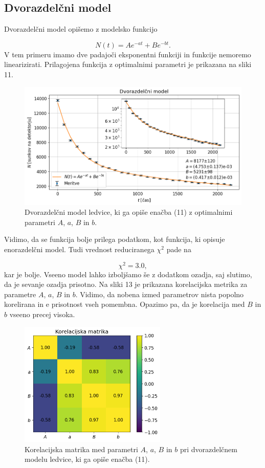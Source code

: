 \documentclass[slovene,11pt,a4paper]{article}
\begin{document}
\subsection{Dvorazdelčni model}

Dvorazdelčni model opišemo z modelsko funkcijo

\begin{equation}
N(t) = Ae^{-at} + Be^{-bt}.
\end{equation}
V tem primeru imamo dve padajoči eksponentni funkciji in funkcije nemoremo linearizirati. Prilagojena funkcija z optimalnimi parametri je prikazana na sliki 11.

\begin{figure}[h!]
\centering
\includegraphics[width=13cm]{ledvice6.png}
\caption{Dvorazdelčni model ledvice, ki ga opiše enačba (11) z optimalnimi parametri $A$, $a$, $B$ in $b$.}
\end{figure}
Vidimo, da se funkcija bolje prilega podatkom, kot funkcija, ki opisuje enorazdelčni model. Tudi vrednost reduciranega $\chi^2$ pade na

\[
\chi^2 = 3.0,
\]
kar je bolje. Vseeno model lahko izboljšamo še z dodatkom ozadja, saj slutimo, da je sevanje ozadja prisotno. Na sliki 13 je prikazana korelacijska metrika za parametre $A$, $a$, $B$ in $b$. Vidimo, da nobena izmed parametrov nista popolno korelirana in e prisotnost vseh pomembna. Opazimo pa, da je korelacija med $B$ in $b$ vseeno precej visoka.

\begin{figure}[h!]
\centering
\includegraphics[width=7cm]{ledvice7.png}
\caption{Korelacijska matrika med parametri $A$, $a$, $B$ in $b$ pri dvorazdelčnem modelu ledvice, ki ga opiše enačba (11).}
\end{figure}
\end{document}
